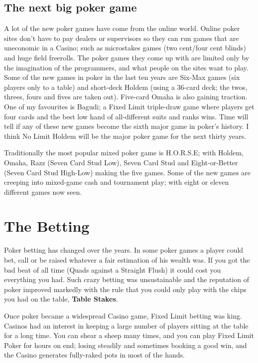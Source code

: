 \subsection{The next big poker game}

A lot of the new poker games have come from the online world. Online
poker sites don't have to pay dealers or supervisors so they can run
games that are uneconomic in a Casino; such as microstakes games (two
cent/four cent blinds) and huge field freerolls. The poker games they
come up with are limited only by the imagination of the programmers,
and what people on the sites want to play. Some of the new games
in poker in the last ten years are Six-Max games (six players only to
a table) and short-deck Holdem (using a 36-card deck; the twos,
threes, fours and fives are taken out). Five-card Omaha is also
gaining traction. One of my favourites is Bagudi; a Fixed Limit
triple-draw game where players get four cards and the best low hand of
all-different suits and ranks wins. Time will tell if any of these new
games become the sixth major game in poker's history. I think No Limit
Holdem will be the major poker game for the next thirty years.

Traditionally the most popular mixed poker game is H.O.R.S.E; with
Holdem, Omaha, Razz (Seven Card Stud Low), Seven Card Stud and
Eight-or-Better (Seven Card Stud High-Low) making the five games.
Some of the new games are creeping into mixed-game cash and tournament
play; with eight or eleven different games now seen.

\section{The Betting}

Poker betting has changed over the years. In some poker games
a player could bet, call or be raised whatever a fair estimation of
his wealth was. If you got the bad beat of all time (Quads against
a Straight Flush) it could cost you everything you had. Such crazy
betting was unsustainable and the reputation of poker
improved markedly with the rule that you could only play with the
chips you had on the table, \textbf{Table Stakes}.

Once poker became a widespread Casino game, Fixed Limit betting was
king. Casinos had an interest in keeping a large number of players
sitting at the table for a long time. You can shear a sheep many times,
and you can play Fixed Limit Poker for hours on end; losing steadily
and sometimes booking a good win, and the Casino generates fully-raked
pots in most of the hands.

